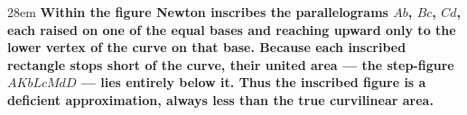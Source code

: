 \documentclass[border=4pt]{standalone}
\begin{document}
\begin{varwidth}{28em}
\large\bfseries
Within the figure Newton inscribes the parallelograms $Ab$, $Bc$, $Cd$,
each raised on one of the equal bases and reaching upward only to the lower vertex
of the curve on that base.
Because each inscribed rectangle stops short of the curve,
their united area — the step-figure $AKbLcMdD$ — lies entirely below it.
Thus the inscribed figure is a deficient approximation, always less than
the true curvilinear area.
\end{varwidth}
\end{document}
